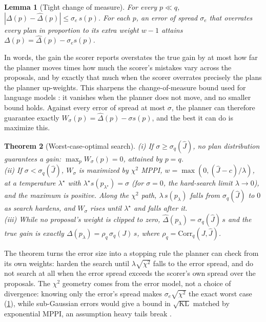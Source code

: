 \documentclass{article}
\theoremstyle{plain}
\newtheorem{theorem}{Theorem}
\newtheorem{lemma}[theorem]{Lemma}
\theoremstyle{remark}
\newcommand{\KL}{\mathrm{KL}}
\newcommand{\Jh}{\hat{J}}
\begin{document}
\begin{lemma}[Tight change of measure]\label{lem:com}
For every $p\ll q$, $|\Delta(p)-\hat\Delta(p)|\le\sigma_e\,s(p)$. For each $p$, an error of spread $\sigma_e$ that
overrates every plan in proportion to its extra weight $w-1$ attains $\Delta(p)=\hat\Delta(p)-\sigma_e s(p)$.
\end{lemma}

In words, the gain the scorer reports overstates the true gain by at most how far the planner moves times how much
the scorer's mistakes vary across the proposals, and by exactly that much when the scorer overrates precisely the plans
the planner up-weights. This sharpens the change-of-measure bound used for language models
\citep{huang2025chipo,huang2025bestofn}: it vanishes when the planner does not move, and no smaller bound holds. Against every error of spread at most $\sigma$, the
planner can therefore guarantee exactly $W_\sigma(p)=\hat\Delta(p)-\sigma s(p)$, and the best it can do is maximize this.

\begin{theorem}[Worst-case-optimal search]\label{thm:chi2}
(i) If $\sigma\ge\sigma_q(\Jh)$, no plan distribution guarantees a gain: $\max_pW_\sigma(p)=0$, attained by $p=q$.
\\[2pt](ii) If $\sigma<\sigma_q(\Jh)$, $W_\sigma$ is maximized by $\chi^2$ MPPI, $w=\max(0,(\Jh-c)/\lambda)$, at a
temperature $\lambda^\star$ with $\lambda^\star s(p_{\lambda^\star})=\sigma$ (for $\sigma=0$, the hard-search limit
$\lambda\to0$), and the maximum is positive. Along the
$\chi^2$ path, $\lambda\,s(p_\lambda)$ falls from $\sigma_q(\Jh)$ to $0$ as search hardens, and $W_\sigma$ rises until
$\lambda^\star$ and falls after it.
\\[2pt](iii) While no proposal's weight is clipped to zero, $\hat\Delta(p_\lambda)=\sigma_q(\Jh)\,s$ and the true gain
is exactly $\Delta(p_\lambda)=\rho_q\,\sigma_q(J)\,s$, where $\rho_q=\mathrm{Corr}_q(J,\Jh)$.
\end{theorem}

The theorem turns the error size into a stopping rule the planner can check from its own weights: harden the search
until $\lambda\sqrt{\chi^2}$ falls to the error spread, and do not search at all when the error spread exceeds the
scorer's own spread over the proposals. The $\chi^2$ geometry comes from the error model, not a choice of divergence:
knowing only the error's spread makes $\sigma_e\sqrt{\chi^2}$ the exact worst case (\cref{lem:com}), while sub-Gaussian
errors would give a bound in $\sqrt{\KL}$ matched by exponential MPPI, an assumption heavy tails break
\citep{kwa2024catastrophic}.
\end{document}
